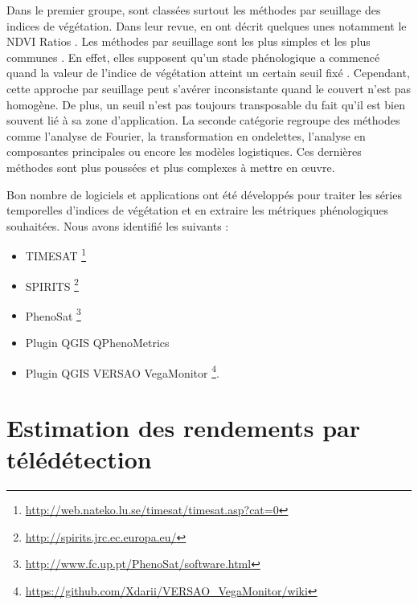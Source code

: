 Dans le premier groupe, sont classées surtout les méthodes par seuillage des indices de végétation. Dans leur revue, \citet{deBeurs2010} en ont décrit quelques unes notamment le NDVI 
Ratios \citep{White1997}. Les méthodes par seuillage sont les plus simples et les plus communes \citep{Pan2015}. En effet, elles supposent qu’un stade phénologique a commencé quand 
la valeur de l'indice de végétation atteint un certain seuil fixé \citep{Jonsson2002}. Cependant, cette approche par seuillage peut s'avérer inconsistante quand le couvert n'est 
pas homogène. De plus, un seuil n'est pas toujours transposable du fait qu'il est bien souvent lié à sa zone d'application. La seconde catégorie regroupe  des méthodes comme
l'analyse de Fourier, la transformation en ondelettes, l'analyse en composantes principales ou encore les modèles logistiques. Ces dernières méthodes sont plus poussées et plus 
complexes à mettre en \oe uvre. 

\vspace{5mm}

Bon nombre de logiciels et applications ont été développés pour traiter les séries temporelles d'indices de végétation et en extraire les métriques phénologiques souhaitées. 
Nous avons identifié les suivants :
\begin{itemize}
 \item TIMESAT \footnote{\url{http://web.nateko.lu.se/timesat/timesat.asp?cat=0}} \citep{Eklundh2017} 
 \item SPIRITS \footnote{\url{http://spirits.jrc.ec.europa.eu/}}
 \item PhenoSat \footnote{\url{http://www.fc.up.pt/PhenoSat/software.html}} \citep{Rodrigues2013}
 \item Plugin QGIS QPhenoMetrics \citep{Duarte2018}
 \item Plugin QGIS VERSAO VegaMonitor \footnote{\url{https://github.com/Xdarii/VERSAO_VegaMonitor/wiki}}.
\end{itemize}

\section{Estimation des rendements par télédétection}
